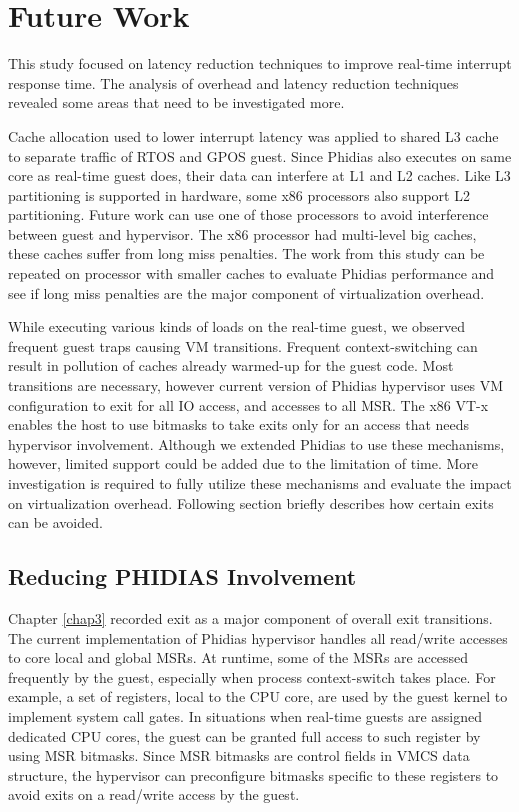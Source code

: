 \section{Future Work}
This study focused on latency reduction techniques to improve real-time interrupt response time.
The analysis of overhead and latency reduction techniques revealed some areas that need to be investigated more.

Cache allocation used to lower interrupt latency was applied to shared L3 cache to separate traffic of RTOS and GPOS guest.
Since Phidias also executes on same core as real-time guest does, their data can interfere at L1
and L2 caches. Like L3 partitioning is supported in hardware, some x86 processors also support L2 partitioning.
Future work can use one of those processors to avoid interference between guest and hypervisor.
The x86 processor had multi-level big caches, these caches suffer from long miss penalties.
The work from this study can be repeated on processor with smaller caches to 
evaluate Phidias performance and see if long miss penalties are the major component of virtualization overhead.

While executing various kinds of loads on the real-time guest, we observed frequent guest traps causing 
VM transitions. Frequent context-switching can result in pollution of caches already warmed-up for the guest code.
Most transitions are necessary, however current version of Phidias hypervisor uses VM configuration to
exit for all IO access, and accesses to all MSR.
The x86 VT-x enables the host to use bitmasks to take exits only for an access that needs hypervisor involvement.
Although we extended Phidias to use these mechanisms, however, limited support could be added due to the limitation of time.
More investigation is required to fully utilize these mechanisms and evaluate the impact on virtualization overhead.
Following section briefly describes how certain exits can be avoided.

\subsection{Reducing PHIDIAS Involvement}

Chapter \ref{chap3} recorded \mwrmsr{} exit as a major component of overall exit transitions.
The current implementation of Phidias hypervisor handles all read/write accesses to core local and global MSRs.
At runtime, some of the MSRs are accessed frequently by the guest, especially when process context-switch takes place. 
For example, a set of registers, local to the CPU core, are used by the guest kernel to implement system call gates. 
In situations when real-time guests are assigned dedicated CPU cores, the guest can be granted full access to such register
by using MSR bitmasks. Since MSR bitmasks are control
fields in VMCS data structure, the hypervisor can preconfigure bitmasks specific to these
registers to avoid exits on a read/write access by the guest.

